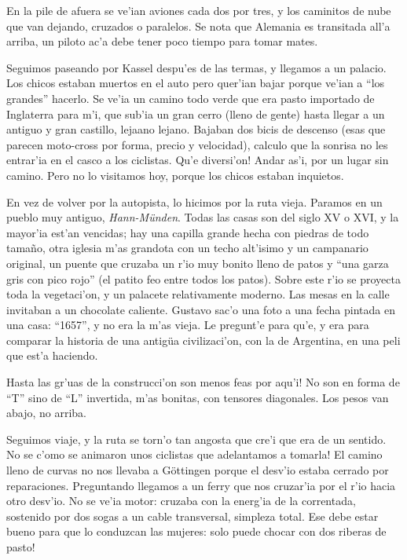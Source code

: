En la pile de afuera se ve'ian aviones cada dos por tres, y los caminitos de
nube que van dejando, cruzados o paralelos. Se nota que Alemania es transitada
all'a arriba, un piloto ac'a debe tener poco tiempo para tomar mates.

Seguimos paseando por Kassel despu'es de las termas, y llegamos a un palacio.
Los chicos estaban muertos en el auto pero quer'ian bajar porque ve'ian a ``los
grandes'' hacerlo. Se ve'ia un camino todo verde que era pasto importado
de Inglaterra para m'i, que sub'ia un gran cerro (lleno de gente) hasta llegar a
un antiguo y gran castillo, lejaano lejano. Bajaban dos bicis de descenso (esas
que parecen moto-cross por forma, precio y velocidad), calculo que la sonrisa
no les entrar'ia en el casco a los ciclistas. \textexclamdown Qu'e diversi'on!
Andar as'i, por un lugar sin camino. Pero no lo visitamos hoy, porque los chicos
estaban inquietos.

En vez de volver por la autopista, lo hicimos por la ruta vieja. Paramos en un
pueblo muy antiguo, \emph{Hann-M\"unden}. Todas las casas son del siglo {\small
XV} o {\small XVI}, y la mayor'ia est'an vencidas; hay una capilla grande hecha
con piedras de todo tama\~no, otra iglesia m'as grandota con un techo alt'isimo
y un campanario original, un puente que cruzaba un r'io muy bonito lleno de
patos y ``una garza gris con pico rojo'' (el patito feo entre todos los patos).
Sobre este r'io se proyecta toda la vegetaci'on, y un palacete relativamente
moderno. Las mesas en la calle invitaban a un chocolate caliente. Gustavo sac'o
una foto a una fecha pintada en una casa: ``1657'', y no era la m'as vieja. Le
pregunt'e para qu'e, y era para comparar la historia de una antig\"ua
civilizaci'on, con la de Argentina, en una peli que est'a haciendo.

\textexclamdown Hasta las gr'uas de la construcci'on son menos feas por aqu'i!
No son en forma de ``T'' sino de ``L'' invertida, m'as bonitas, con tensores
diagonales. Los pesos van abajo, no arriba.

Seguimos viaje, y la ruta se torn'o tan angosta que cre'i que era de un sentido.
\textexclamdown No se c'omo se animaron unos ciclistas que adelantamos a
tomarla! El camino lleno de curvas no nos llevaba a G\"ottingen porque el
desv'io estaba cerrado por reparaciones. Preguntando llegamos a un ferry que nos
cruzar'ia por el r'io hacia otro desv'io. No se ve'ia motor: cruzaba con la
energ'ia de la correntada, sostenido por dos sogas a un cable transversal,
simpleza total. Ese debe estar bueno para que lo conduzcan las mujeres:
\textexclamdown solo puede chocar con dos riberas de pasto!


